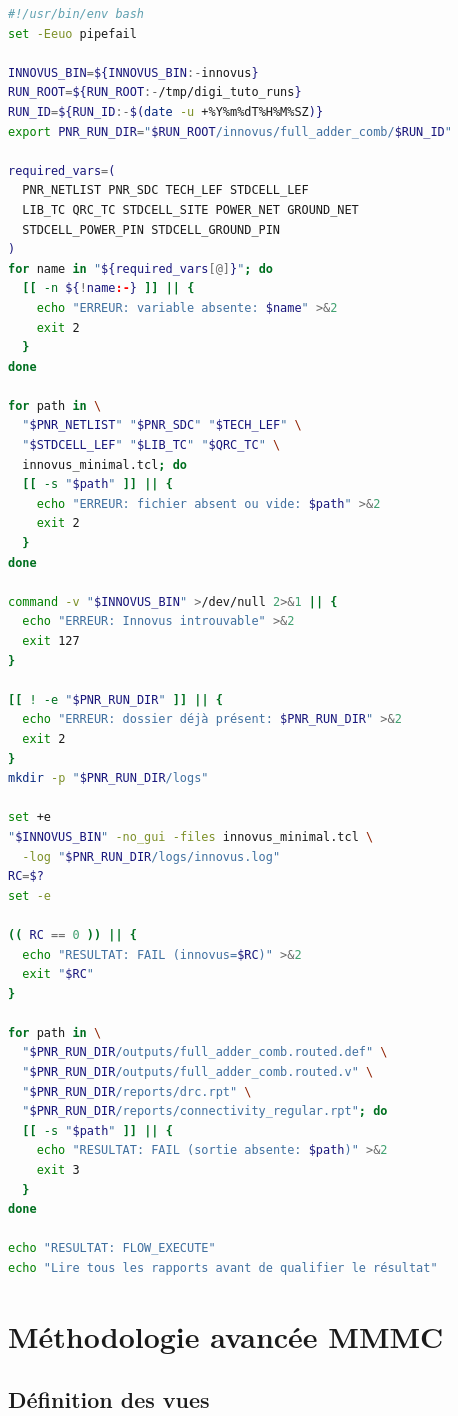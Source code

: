 \documentclass[11pt,a4paper,openany]{report}
\begin{document}
\begin{lstlisting}[style=guidecode,language=bash,
caption={run\_innovus.sh}]
#!/usr/bin/env bash
set -Eeuo pipefail

INNOVUS_BIN=${INNOVUS_BIN:-innovus}
RUN_ROOT=${RUN_ROOT:-/tmp/digi_tuto_runs}
RUN_ID=${RUN_ID:-$(date -u +%Y%m%dT%H%M%SZ)}
export PNR_RUN_DIR="$RUN_ROOT/innovus/full_adder_comb/$RUN_ID"

required_vars=(
  PNR_NETLIST PNR_SDC TECH_LEF STDCELL_LEF
  LIB_TC QRC_TC STDCELL_SITE POWER_NET GROUND_NET
  STDCELL_POWER_PIN STDCELL_GROUND_PIN
)
for name in "${required_vars[@]}"; do
  [[ -n ${!name:-} ]] || {
    echo "ERREUR: variable absente: $name" >&2
    exit 2
  }
done

for path in \
  "$PNR_NETLIST" "$PNR_SDC" "$TECH_LEF" \
  "$STDCELL_LEF" "$LIB_TC" "$QRC_TC" \
  innovus_minimal.tcl; do
  [[ -s "$path" ]] || {
    echo "ERREUR: fichier absent ou vide: $path" >&2
    exit 2
  }
done

command -v "$INNOVUS_BIN" >/dev/null 2>&1 || {
  echo "ERREUR: Innovus introuvable" >&2
  exit 127
}

[[ ! -e "$PNR_RUN_DIR" ]] || {
  echo "ERREUR: dossier déjà présent: $PNR_RUN_DIR" >&2
  exit 2
}
mkdir -p "$PNR_RUN_DIR/logs"

set +e
"$INNOVUS_BIN" -no_gui -files innovus_minimal.tcl \
  -log "$PNR_RUN_DIR/logs/innovus.log"
RC=$?
set -e

(( RC == 0 )) || {
  echo "RESULTAT: FAIL (innovus=$RC)" >&2
  exit "$RC"
}

for path in \
  "$PNR_RUN_DIR/outputs/full_adder_comb.routed.def" \
  "$PNR_RUN_DIR/outputs/full_adder_comb.routed.v" \
  "$PNR_RUN_DIR/reports/drc.rpt" \
  "$PNR_RUN_DIR/reports/connectivity_regular.rpt"; do
  [[ -s "$path" ]] || {
    echo "RESULTAT: FAIL (sortie absente: $path)" >&2
    exit 3
  }
done

echo "RESULTAT: FLOW_EXECUTE"
echo "Lire tous les rapports avant de qualifier le résultat"
\end{lstlisting}

\chapter{Méthodologie avancée MMMC}

\section{Définition des vues}
\end{document}
